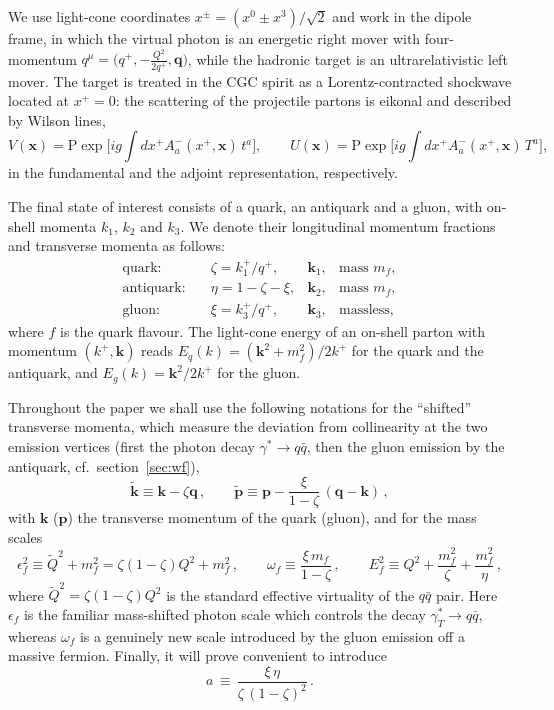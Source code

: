 \documentclass[11pt,a4paper]{article}
\newcommand{\vx}{\bm{x}}
\newcommand{\vk}{\bm{k}}
\newcommand{\vp}{\bm{p}}
\newcommand{\vq}{\bm{q}}
\newcommand{\kt}{\widetilde{\bm{k}}}
\newcommand{\pt}{\widetilde{\bm{p}}}
\newcommand{\eps}{\epsilon}
\numberwithin{equation}{section}
\begin{document}
We use light-cone coordinates $x^{\pm}=(x^0\pm x^3)/\sqrt{2}$ and work in the dipole frame, in
which the virtual photon is an energetic right mover with four-momentum
$q^{\mu}=\big(q^+,-\tfrac{Q^2}{2q^+},\vq\big)$, while the hadronic target is an ultrarelativistic
left mover. The target is treated in the CGC spirit as a Lorentz-contracted shockwave located at
$x^+=0$: the scattering of the projectile partons is eikonal and described by Wilson lines,
\begin{equation}
V(\vx)=\mathrm{P}\exp\Big[ig\!\int\! dx^+ A^-_a(x^+,\vx)\,t^a\Big],\qquad
U(\vx)=\mathrm{P}\exp\Big[ig\!\int\! dx^+ A^-_a(x^+,\vx)\,T^a\Big],
\end{equation}
in the fundamental and the adjoint representation, respectively.

The final state of interest consists of a quark, an antiquark and a gluon, with
on-shell momenta $k_1$, $k_2$ and $k_3$. We denote their longitudinal momentum fractions and
transverse momenta as follows:
\begin{equation}
\label{eq:fractions}
\begin{array}{llll}
\text{quark:} & \zeta=k_1^+/q^+, & \vk_1, & \text{mass } m_f,\\[2pt]
\text{antiquark:}\quad & \eta=1-\zeta-\xi, & \vk_2, & \text{mass } m_f,\\[2pt]
\text{gluon:} & \xi=k_3^+/q^+, & \vk_3, & \text{massless},
\end{array}
\end{equation}
where $f$ is the quark flavour. The light-cone energy of an on-shell parton with momentum
$(k^+,\vk)$ reads $E_q(k)=({\vk^2+m_f^2})/{2k^+}$ for the quark and the antiquark, and
$E_g(k)={\vk^2}/{2k^+}$ for the gluon.

Throughout the paper we shall use the following notations for the ``shifted'' transverse
momenta, which measure the deviation from collinearity at the two emission vertices (first the
photon decay $\gamma^*\to q\bar q$, then the gluon emission by the antiquark, cf.\
section~\ref{sec:wf}),
\begin{equation}
\label{eq:shifted}
\kt\equiv \vk-\zeta\vq\,,\qquad
\pt\equiv \vp-\frac{\xi}{1-\zeta}\,(\vq-\vk)\,,
\end{equation}
with $\vk$ ($\vp$) the transverse momentum of the quark (gluon), and for the mass scales
\begin{equation}
\label{eq:scales}
\eps_f^2\equiv\widetilde Q^2+m_f^2=\zeta(1-\zeta)Q^2+m_f^2\,,\qquad
\omega_f\equiv\frac{\xi\,m_f}{1-\zeta}\,,\qquad
E_f^2\equiv Q^2+\frac{m_f^2}{\zeta}+\frac{m_f^2}{\eta}\,,
\end{equation}
where $\widetilde Q^2=\zeta(1-\zeta)Q^2$ is the standard effective virtuality of the $q\bar q$
pair. Here $\eps_f$ is the familiar mass-shifted photon scale which controls the decay
$\gamma^*_T\to q\bar q$, whereas $\omega_f$ is a genuinely new scale introduced by the gluon
emission off a massive fermion. Finally, it will prove convenient to introduce
\begin{equation}
\label{eq:adef}
a\,\equiv\,\frac{\xi\,\eta}{\zeta\,(1-\zeta)^{2}}\,.
\end{equation}
\end{document}
